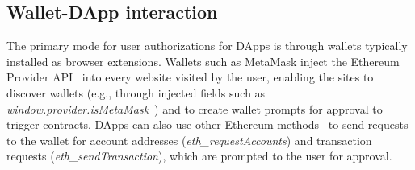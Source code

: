\documentclass[conference]{IEEEtran}
\begin{document}
\subsection{Wallet-DApp interaction}
The primary mode for user authorizations for DApps is through wallets typically installed as browser extensions.
Wallets such as MetaMask inject the Ethereum Provider API~\cite{providerAPI} into every website visited by the user, enabling the sites to discover wallets (e.g., through injected fields such as \textit{window.provider.isMetaMask}~\cite{metamaskProviderApi}) and to create wallet prompts for approval to trigger contracts.
DApps can also use other Ethereum methods~\cite{metamaskJsonRpcApi} to send requests to the wallet for account addresses (\textit{eth\_requestAccounts})
and transaction requests (\textit{eth\_sendTransaction}), which are prompted to the user for approval.
\end{document}
